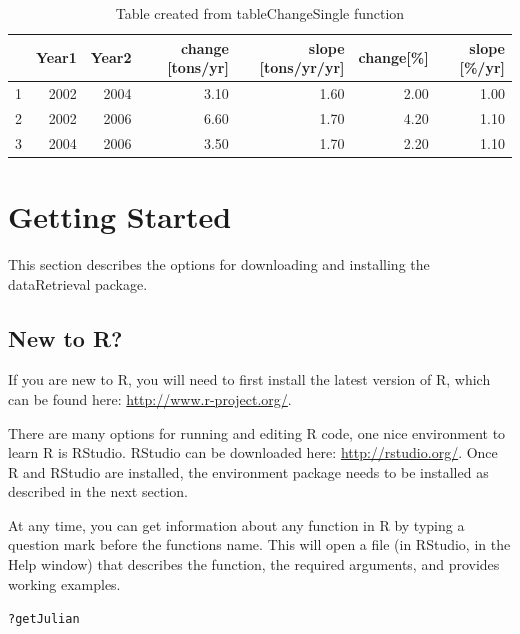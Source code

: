 \documentclass[a4paper,11pt]{article}\usepackage{graphicx, color}
\makeatletter
\newenvironment{kframe}{%
 \def\at@end@of@kframe{}%
 \ifinner\ifhmode%
  \def\at@end@of@kframe{\end{minipage}}%
  \begin{minipage}{\columnwidth}%
 \fi\fi%
 \def\FrameCommand##1{\hskip\@totalleftmargin \hskip-\fboxsep
 \colorbox{shadecolor}{##1}\hskip-\fboxsep
     \hskip-\linewidth \hskip-\@totalleftmargin \hskip\columnwidth}%
 \MakeFramed {\advance\hsize-\width
   \@totalleftmargin\z@ \linewidth\hsize
   \@setminipage}}%
 {\par\unskip\endMakeFramed%
 \at@end@of@kframe}
\newenvironment{knitrout}{}{} %
\makeatother
\begin{document}
\begin{table}[ht]
\centering
\begin{tabular}{rrrrrrr}
  \hline
 & Year1 & Year2 & change [tons/yr] & slope [tons/yr/yr] & change[\%] & slope [\%/yr] \\ 
  \hline
1 & 2002 & 2004 & 3.10 & 1.60 & 2.00 & 1.00 \\ 
  2 & 2002 & 2006 & 6.60 & 1.70 & 4.20 & 1.10 \\ 
  3 & 2004 & 2006 & 3.50 & 1.70 & 2.20 & 1.10 \\ 
   \hline
\end{tabular}
\caption{Table created from tableChangeSingle function} 
\label{table:tableChangeSingle}
\end{table}


\clearpage

\FloatBarrier
\appendix
\section{Getting Started}
\label{sec:appendix1}
This section describes the options for downloading and installing the dataRetrieval package.

\subsection{New to R?}
If you are new to R, you will need to first install the latest version of R, which can be found here: \url{http://www.r-project.org/}.

There are many options for running and editing R code, one nice environment to learn R is RStudio. RStudio can be downloaded here: \url{http://rstudio.org/}. Once R and RStudio are installed, the environment package needs to be installed as described in the next section.

At any time, you can get information about any function in R by typing a question mark before the functions name.  This will open a file (in RStudio, in the Help window) that describes the function, the required arguments, and provides working examples.

\begin{knitrout}
\color{fgcolor}\begin{kframe}
\begin{alltt}
?getJulian
\end{alltt}
\end{kframe}
\end{knitrout}
\end{document}
